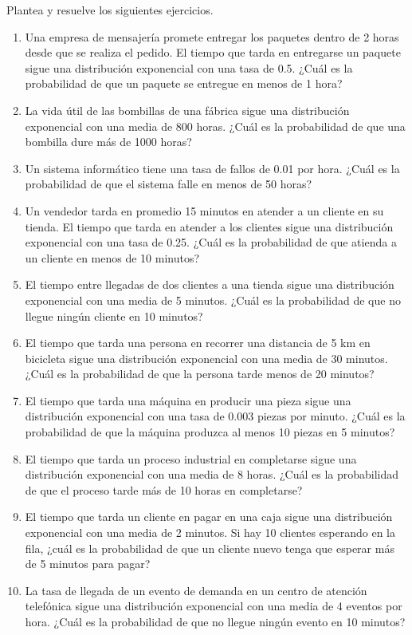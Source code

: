 \begin{Ejer} 
Plantea y resuelve los siguientes ejercicios.
\begin{enumerate}
    \item Una empresa de mensajería promete entregar los paquetes dentro de 2 horas desde que se realiza el pedido. El tiempo que tarda en entregarse un paquete sigue una distribución exponencial con una tasa de 0.5. ¿Cuál es la probabilidad de que un paquete se entregue en menos de 1 hora?
    \item La vida útil de las bombillas de una fábrica sigue una distribución exponencial con una media de 800 horas. ¿Cuál es la probabilidad de que una bombilla dure más de 1000 horas?
    \item Un sistema informático tiene una tasa de fallos de 0.01 por hora. ¿Cuál es la probabilidad de que el sistema falle en menos de 50 horas?
    \item Un vendedor tarda en promedio 15 minutos en atender a un cliente en su tienda. El tiempo que tarda en atender a los clientes sigue una distribución exponencial con una tasa de 0.25. ¿Cuál es la probabilidad de que atienda a un cliente en menos de 10 minutos?
    \item El tiempo entre llegadas de dos clientes a una tienda sigue una distribución exponencial con una media de 5 minutos. ¿Cuál es la probabilidad de que no llegue ningún cliente en 10 minutos?
    \item El tiempo que tarda una persona en recorrer una distancia de 5 km en bicicleta sigue una distribución exponencial con una media de 30 minutos. ¿Cuál es la probabilidad de que la persona tarde menos de 20 minutos?
    \item El tiempo que tarda una máquina en producir una pieza sigue una distribución exponencial con una tasa de 0.003 piezas por minuto. ¿Cuál es la probabilidad de que la máquina produzca al menos 10 piezas en 5 minutos?
    \item El tiempo que tarda un proceso industrial en completarse sigue una distribución exponencial con una media de 8 horas. ¿Cuál es la probabilidad de que el proceso tarde más de 10 horas en completarse?
    \item El tiempo que tarda un cliente en pagar en una caja sigue una distribución exponencial con una media de 2 minutos. Si hay 10 clientes esperando en la fila, ¿cuál es la probabilidad de que un cliente nuevo tenga que esperar más de 5 minutos para pagar?
    \item La tasa de llegada de un evento de demanda en un centro de atención telefónica sigue una distribución exponencial con una media de 4 eventos por hora. ¿Cuál es la probabilidad de que no llegue ningún evento en 10 minutos?

\end{enumerate}
\end{Ejer} 

